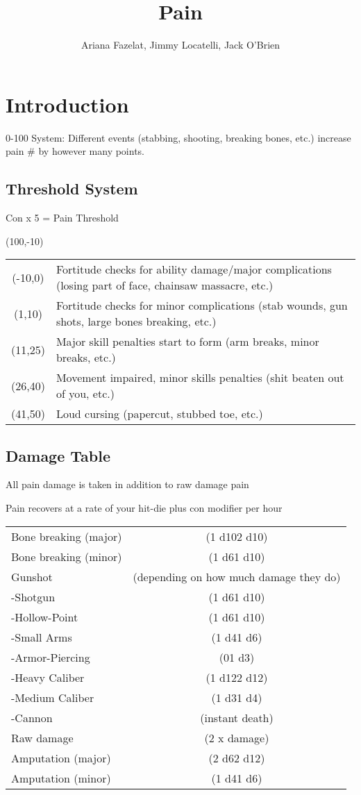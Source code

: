 \documentclass[12pt]{article}
\begin{document}
\title{Pain}
\author{Ariana Fazelat, Jimmy Locatelli, Jack O'Brien}
\maketitle

\section{Introduction}

0-100 System:
Different events (stabbing, shooting, breaking bones, etc.) increase pain \# by however many points.

\subsection{Threshold System}

Con x 5 = Pain Threshold

(100,-10)


\begin{tabular}{ c | p{15cm} }
(-10,0) & Fortitude checks for ability damage/major complications (losing part of face, chainsaw massacre, etc.) \\
(1,10) &  Fortitude checks for minor complications (stab wounds, gun shots, large bones breaking, etc.) \\
(11,25) & Major skill penalties start to form (arm breaks, minor breaks, etc.) \\
(26,40) & Movement impaired, minor skills penalties (shit beaten out of you, etc.) \\
(41,50) & Loud cursing (papercut, stubbed toe, etc.) \\
\end{tabular}

\subsection{Damage Table}

All pain damage is taken in addition to raw damage pain

Pain recovers at a rate of your hit-die plus con modifier per hour

\begin{tabular}{ l | c }
Bone breaking (major) & (1 d10\/2 d10) \\
Bone breaking (minor) & (1 d6\/1 d10) \\
Gunshot & (depending on how much damage they do) \\  
-Shotgun & (1 d6\/1 d10) \\
-Hollow-Point & (1 d6\/1 d10) \\
-Small Arms & (1 d4\/1 d6) \\
-Armor-Piercing & (0\/1 d3) \\
-Heavy Caliber & (1 d12\/2 d12) \\
-Medium Caliber & (1 d3\/1 d4) \\
-Cannon & (instant death) \\
Raw damage & (2 x damage) \\
Amputation (major) & (2 d6\/2 d12) \\
Amputation (minor) & (1 d4\/1 d6) \\
\end{tabular}

\end{document}
